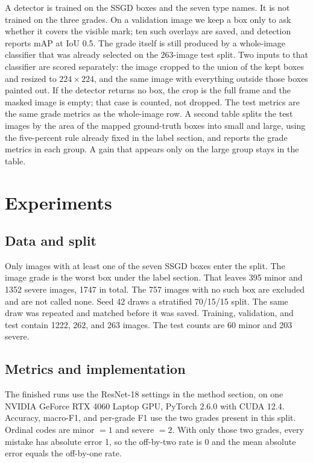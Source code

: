 \documentclass[10pt]{article}
\begin{document}
A detector is trained on the SSGD boxes and the seven type names. It is not trained on the three grades. On a validation image we keep a box only to ask whether it covers the visible mark; ten such overlays are saved, and detection reports mAP at IoU 0.5. The grade itself is still produced by a whole-image classifier that was already selected on the 263-image test split. Two inputs to that classifier are scored separately: the image cropped to the union of the kept boxes and resized to $224\times 224$, and the same image with everything outside those boxes painted out. If the detector returns no box, the crop is the full frame and the masked image is empty; that case is counted, not dropped. The test metrics are the same grade metrics as the whole-image row. A second table splits the test images by the area of the mapped ground-truth boxes into small and large, using the five-percent rule already fixed in the label section, and reports the grade metrics in each group. A gain that appears only on the large group stays in the table.

\section{Experiments}
\subsection{Data and split}
Only images with at least one of the seven SSGD boxes enter the split. The image grade is the worst box under the label section. That leaves 395 minor and 1352 severe images, 1747 in total. The 757 images with no such box are excluded and are not called none. Seed 42 draws a stratified 70/15/15 split. The same draw was repeated and matched before it was saved. Training, validation, and test contain 1222, 262, and 263 images. The test counts are 60 minor and 203 severe.

\subsection{Metrics and implementation}
The finished runs use the ResNet-18 settings in the method section, on one NVIDIA GeForce RTX 4060 Laptop GPU, PyTorch 2.6.0 with CUDA 12.4. Accuracy, macro-F1, and per-grade F1 use the two grades present in this split. Ordinal codes are minor $=1$ and severe $=2$. With only those two grades, every mistake has absolute error 1, so the off-by-two rate is 0 and the mean absolute error equals the off-by-one rate.
\end{document}
